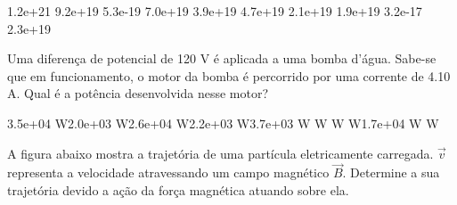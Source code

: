 \documentclass[12pt, addpoints]{exam}
\begin{document}
\begin{questions}
\begin{multicols*}{2}
\begin{oneparchoices}
\choice 1.2e+21 \choice 9.2e+19 \choice 5.3e-19 \choice 7.0e+19 \choice 3.9e+19 \choice 4.7e+19 \choice 2.1e+19 \choice 1.9e+19 \choice 3.2e-17 \choice 2.3e+19 
\end{oneparchoices}\question Uma diferença de potencial de 120 V é aplicada a uma bomba d’água. Sabe-se que em funcionamento, o motor da bomba é percorrido por uma corrente de    4.10 A. Qual é a potência desenvolvida nesse motor?

\begin{oneparchoices}
\choice 3.5e+04 W\choice 2.0e+03 W\choice 2.6e+04 W\choice 2.2e+03 W\choice 3.7e+03 W W W W\choice 1.7e+04 W W
\end{oneparchoices}\question A ﬁgura abaixo mostra a trajetória de uma partícula eletricamente carregada. $\vec{{v}}$ representa a velocidade atravessando um campo magnético $\vec{{B}}$. Determine a sua trajetória devido a ação da força magnética atuando sobre ela.
        
        \begin{center}
            \begin{minipage}[c]{0.5\linewidth}
            \end{minipage}
        \end{center}

        


\end{multicols*}
\end{questions}
\end{document}
